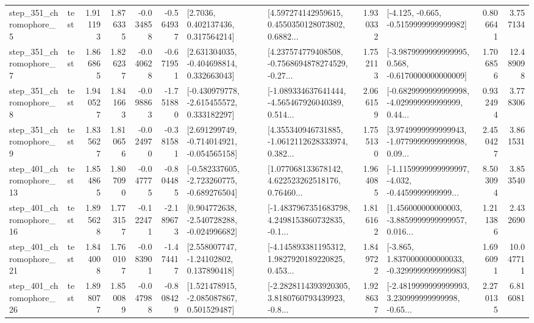 \begin{tabular}{llrrrrllrlrr}
   step\_351\_chromophore\_5 &      test &      1.911193 &    1.876335 &     -0.034858 & -0.564937 &          [2.7036, 0.402137436, 0.317564214] &  [4.597274142959615, 0.4550350128073802, 0.6882... &       1.930332 &              [-4.125, -0.665, -0.5159999999999982] &            0.806641 &          3.757134 \\
   step\_351\_chromophore\_7 &      test &      1.866865 &    1.826237 &     -0.040628 & -0.671951 &    [2.631304035, -0.404698814, 0.332663043] &  [4.237574779408508, -0.7568694878274529, -0.27... &       1.752113 &  [-3.9879999999999995, 0.568, -0.6170000000000009] &            1.706856 &         12.489098 \\
   step\_351\_chromophore\_8 &      test &      1.940527 &    1.841663 &     -0.098863 & -1.751880 &   [-0.430979778, -2.615455572, 0.333182297] &  [-1.089334637641444, -4.565467926040389, 0.514... &       2.066159 &  [-0.6829999999999998, -4.029999999999999, 0.44... &            0.932494 &          3.778306 \\
   step\_351\_chromophore\_9 &      test &      1.835627 &    1.810656 &     -0.024970 & -0.381581 &   [2.691299749, -0.714014921, -0.054565158] &  [4.355340946731885, -1.0612112628333974, 0.382... &       1.755130 &  [3.9749999999999943, -1.0779999999999998, 0.09... &            2.450427 &          3.861531 \\
  step\_401\_chromophore\_13 &      test &      1.854865 &    1.807090 &     -0.047775 & -0.804485 &  [-0.582337605, -2.723260775, -0.689276504] &  [1.077068133678142, 4.622523262518176, 0.76460... &       1.964085 &  [-1.1159999999999997, -4.032, -0.4459999999999... &            8.503094 &          3.853540 \\
  step\_401\_chromophore\_16 &      test &      1.895628 &    1.773157 &     -0.122471 & -2.189673 &   [0.904772638, -2.540728288, -0.024996682] &  [-1.4837967351683798, 4.2498153860732835, -0.1... &       1.816162 &  [1.456000000000003, -3.8859999999999957, 0.016... &            1.211386 &          2.432690 \\
  step\_401\_chromophore\_21 &      test &      1.844008 &    1.760107 &     -0.083901 & -1.474417 &     [2.558007747, -1.24102802, 0.137890418] &  [-4.145893381195312, 1.9827920189220825, 0.453... &       1.849722 &  [-3.865, 1.8370000000000033, -0.3299999999999983] &            1.696091 &         10.047711 \\
  step\_401\_chromophore\_26 &      test &      1.898077 &    1.850089 &     -0.047988 & -0.808429 &    [1.521478915, -2.085087867, 0.501529487] &  [-2.2828114393920305, 3.8180760793439923, -0.8... &       1.928637 &  [-2.4819999999999993, 3.230999999999998, -0.65... &            2.270135 &          6.816081 \\

\end{tabular}
